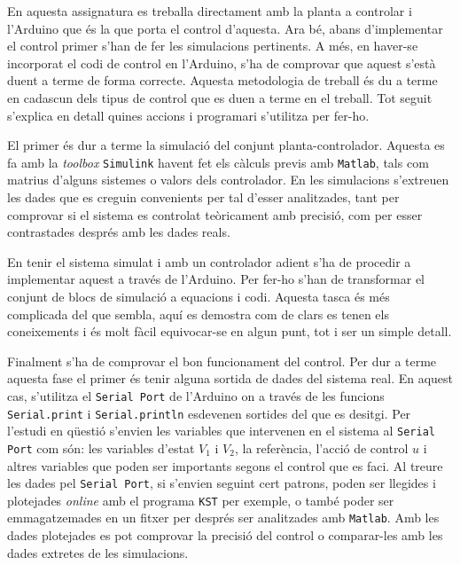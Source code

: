 \documentclass[12pt,a4paper,final,twoside,openright]{report}
\begin{document}
En aquesta assignatura es treballa directament amb la planta a controlar i l'Arduino que és la que porta el control d'aquesta. Ara bé, abans d'implementar el control primer s'han de fer les simulacions pertinents. A més, en haver-se incorporat el codi de control en l'Arduino, s'ha de comprovar que aquest s'està duent a terme de forma correcte. Aquesta metodologia de treball és du a terme en cadascun dels tipus de control que es duen a terme en el treball. Tot seguit s'explica en detall quines accions i programari s'utilitza per fer-ho.

El primer és dur a terme la simulació del conjunt planta-controlador. Aquesta es fa amb la \textit{toolbox} \texttt{Simulink} havent fet els càlculs previs amb \texttt{Matlab}, tals com matrius d'alguns sistemes o valors dels controlador. En les simulacions s'extreuen les dades que es creguin convenients per tal d'esser analitzades, tant per comprovar si el sistema es controlat teòricament amb precisió, com per esser contrastades després amb les dades reals.

En tenir el sistema simulat i amb un controlador adient s'ha de procedir a implementar aquest a través de l'Arduino. Per fer-ho s'han de transformar el conjunt de blocs de simulació a equacions i codi. Aquesta tasca és més complicada del que sembla, aquí es demostra com de clars es tenen els coneixements i és molt fàcil equivocar-se en algun punt, tot i ser un simple detall.

Finalment s'ha de comprovar el bon funcionament del control. Per dur a terme aquesta fase el primer és tenir alguna sortida de dades del sistema real. En aquest cas, s'utilitza el \texttt{Serial Port} de l'Arduino on a través de les funcions \texttt{Serial.print} i \texttt{Serial.println} esdevenen sortides del que es desitgi. Per l'estudi en qüestió s'envien les variables que intervenen en el sistema al \texttt{Serial Port} com són: les variables d'estat $V_1$ i $V_2$, la referència, l'acció de control $u$ i altres variables que poden ser importants segons el control que es faci. Al treure les dades pel \texttt{Serial Port}, si s'envien seguint cert patrons, poden ser llegides i plotejades \textit{online} amb el programa \texttt{KST} per exemple, o també poder ser emmagatzemades en un fitxer per després ser analitzades amb \texttt{Matlab}. Amb les dades plotejades es pot comprovar la precisió del control o comparar-les amb les dades extretes de les simulacions.

\paragraph{$ $}
\end{document}
